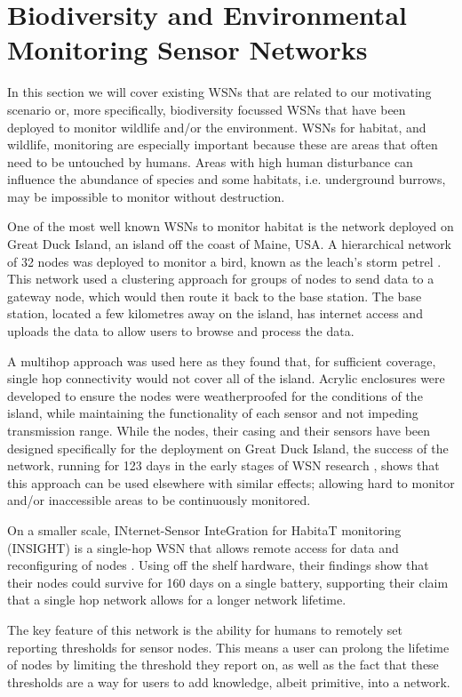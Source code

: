 \section{Biodiversity and Environmental Monitoring Sensor Networks} \label{bg:bsn}
	In this section we will cover existing WSNs that are related to our motivating scenario or, more specifically, biodiversity focussed WSNs that have been deployed to monitor wildlife and/or the environment. WSNs for habitat, and wildlife, monitoring are especially important because these are areas that often need to be untouched by humans. Areas with high human disturbance can influence the abundance of species and some habitats, i.e. underground burrows, may be impossible to monitor without destruction. 
	
	One of the most well known WSNs to monitor habitat is the network deployed on Great Duck Island, an island off the coast of Maine, USA. A hierarchical network of 32 nodes was deployed to monitor a bird, known as the leach’s storm petrel \cite{Mainwaring2002}. This network used a clustering approach for groups of nodes to send data to a gateway node, which would then route it back to the base station. The base station, located a few kilometres away on the island, has internet access and uploads the data to allow users to browse and process the data.

	A multihop approach was used here as they found that, for sufficient coverage, single hop connectivity would not cover all of the island. Acrylic enclosures were developed to ensure the nodes were weatherproofed for the conditions of the island, while maintaining the functionality of each sensor and not impeding transmission range. While the nodes, their casing and their sensors have been designed specifically for the deployment on Great Duck Island, the success of the network, running for 123 days in the early stages of WSN research \cite{Szewczyk2004c}, shows that this approach can be used elsewhere with similar effects; allowing hard to monitor and/or inaccessible areas to be continuously monitored.

	On a smaller scale, INternet-Sensor InteGration for HabitaT monitoring (INSIGHT) is a single-hop WSN that allows remote access for data and reconfiguring of nodes \cite{Demirbas}. Using off the shelf hardware, their findings show that their nodes could survive for 160 days on a single battery, supporting their claim that a single hop network allows for a longer network lifetime. 
	
	The key feature of this network is the ability for humans to remotely set reporting thresholds for sensor nodes. This means a user can prolong the lifetime of nodes by limiting the threshold they report on, as well as the fact that these thresholds are a way for users to add knowledge, albeit primitive, into a network.

